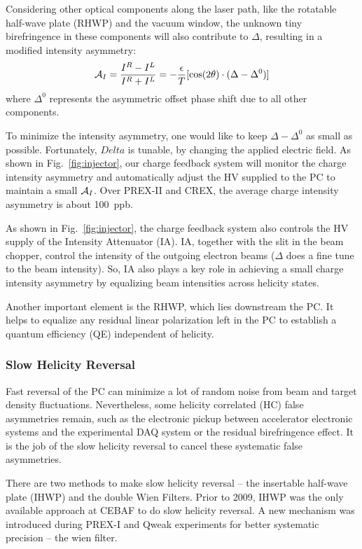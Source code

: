 Considering other optical components along the laser path, like the rotatable half-wave plate 
(RHWP) and the vacuum window, the unknown tiny birefringence in these components will also 
contribute to $\Delta$, resulting in a modified intensity asymmetry:
\begin{equation}
    \mathcal{A}_{I} = \frac{I^R - I^L}{I^R + I^L} = -\frac{\epsilon}{T}[\cos(2\theta)\cdot(\Delta - \Delta^0)]	\\
\end{equation}
where $\Delta^0$ represents the asymmetric offset phase shift due to all other components.

To minimize the intensity asymmetry, one would like to keep $\Delta - \Delta^0$
as small as possible. Fortunately, $Delta$ is tunable, by changing the applied
electric field. As shown in Fig.~\ref{fig:injector}, our charge feedback system
will monitor the charge intensity asymmetry and automatically adjust the HV 
supplied to the PC to maintain a small $\mathcal{A}_I$. Over PREX-II and CREX, the average charge
intensity asymmetry is about 100~ppb.

As shown in Fig.~\ref{fig:injector}, the charge feedback system also
controls the HV supply of the Intensity Attenuator (IA). IA, together with
the slit in the beam chopper, control the intensity of the outgoing electron beams
($\Delta$ does a fine tune to the beam intensity). So, IA also
plays a key role in achieving a small charge intensity asymmetry by equalizing
beam intensities across helicity states.

Another important element is the RHWP, which lies downstream the PC.
It helps to equalize any residual linear polarization left in the PC to establish 
a quantum efficiency (QE) independent of helicity.

\subsubsection{Slow Helicity Reversal}
Fast reversal of the PC can minimize a lot of random noise from beam and target
density fluctuations. Nevertheless, some helicity correlated (HC) false asymmetries
remain, such as the electronic pickup between accelerator electronic systems and 
the experimental DAQ system or the residual birefringence effect. It is the 
job of the slow helicity reversal to cancel these systematic false asymmetries.

There are two methods to make slow helicity reversal -- the insertable half-wave plate (IHWP) 
and the double Wien Filters. Prior to 2009, IHWP was the only available approach
at CEBAF to do slow helicity reversal. A new mechanism was introduced during 
PREX-I and Qweak experiments for better systematic precision -- the wien filter.

